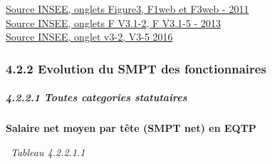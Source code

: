 \href{../Docs/ip1486.xls}{Source INSEE, onglets Figure3, F1web et F3web -
2011}\\
\href{../Docs/vue3_remunerations.xls}{Source INSEE, onglets F V3.1-2, F
V3.1-5 - 2013}\\
\href{../Docs/Vue-Remunerations-2018.xlsx}{Source INSEE, onglet v3-2, V3-5
2016}

\hypertarget{evolution-du-smpt-des-fonctionnaires}{%
\subsubsection{4.2.2 Evolution du SMPT des
fonctionnaires}\label{evolution-du-smpt-des-fonctionnaires}}

\hypertarget{toutes-categories-statutaires}{%
\subparagraph{4.2.2.1 Toutes categories
statutaires}\label{toutes-categories-statutaires}}

\textbf{Salaire net moyen par tête (SMPT net) en EQTP}

~\emph{Tableau 4.2.2.1.1}

